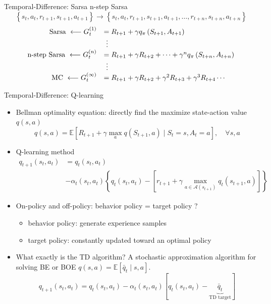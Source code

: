 \documentclass[UTF8, 10pt]{beamer}
\begin{document}
\begin{CJK*}{UTF8}{gbsn}
\begin{frame}{Temporal-Difference: Sarsa}
	n-step Sarsa
	$$\left\{s_{t}, a_{t}, r_{t+1}, s_{t+1}, a_{t+1}\right\} \rightarrow\left\{s_{t}, a_{t}, r_{t+1}, s_{t+1}, a_{t+1}, \ldots, r_{t+n}, s_{t+n}, a_{t+n}\right\}$$
	$$
	\begin{array}{r l} \text {Sarsa}\ \longleftarrow  G_{t}^{(1)}&=R_{t+1}+\gamma q_{\pi}\left(S_{t+1}, A_{t+1}\right)  \\ &\ \vdots \\ \text{n-step Sarsa}\ \longleftarrow  G_{t}^{(n)}&=R_{t+1}+\gamma R_{t+2}+\cdots+\gamma^{n} q_{\pi}\left(S_{t+n}, A_{t+n}\right)\\&\  \vdots \\ \mathrm{MC}\ \longleftarrow  G_{t}^{(\infty)}&=R_{t+1}+\gamma R_{t+2}+\gamma^{2} R_{t+3}+\gamma^{3} R_{t+4} \cdots\end{array}
	$$
\end{frame}
\begin{frame}{Temporal-Difference: Q-learning}
	\begin{itemize}
		\item Bellman optimality equation: directly find the maximize state-action value $q(s, a)$
			$$
			q(s, a)=\mathbb{E}\left[R_{t+1}+\gamma \max _{a} q\left(S_{t+1}, a\right) \mid S_{t}=s, A_{t}=a\right],\quad \forall s, a
			$$
		\item Q-learning method
			$$
			\begin{aligned}
			q_{t+1}\left(s_{t}, a_{t}\right)
			&=q_{t}\left(s_{t}, a_{t}\right)
			\\&-\alpha_{t}\left(s_{t}, a_{t}\right)\left\{q_{t}\left(s_{t}, a_{t}\right)-\left[r_{t+1}+\gamma \max _{a \in \mathcal{A}\left(s_{t+1}\right)} q_{t}\left(s_{t+1}, a\right)\right]\right\}
			\end{aligned}
			$$
		\item On-policy and off-policy: behavior policy = target policy ?
			\begin{itemize}
				\item behavior policy: generate experience samples
				\item target policy: constantly updated toward an optimal policy
			\end{itemize}
		\item What exactly is the TD algorithm? A stochastic approximation algorithm for solving BE or BOE $q(s, a)=\mathbb{E}\left[\bar{q}_{t} \mid s, a\right]$.
			$$
			q_{t+1}\left(s_{t}, a_{t}\right)=q_{t}\left(s_{t}, a_{t}\right)-\alpha_{t}\left(s_{t}, a_{t}\right)[q_{t}\left(s_{t}, a_{t}\right)-\underbrace{\bar{q}_{t}}_{\text{TD target}}]
			$$

\end{itemize}
\end{frame}
\end{CJK*}
\end{document}

